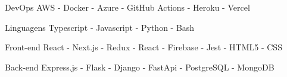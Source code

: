

\begin{cvskills}

  \cvskill
    {DevOps} %
    {AWS - Docker - Azure - GitHub Actions - Heroku - Vercel} %

  \cvskill
    {Linguagens} %
    {Typescript - Javascript - Python - Bash} %

  \cvskill
      {Front-end} %
      {React - Next.js - Redux - React - Firebase - Jest - HTML5 - CSS} %

  \cvskill
    {Back-end} %
    {Express.js - Flask - Django - FastApi -  PostgreSQL - MongoDB} %

\end{cvskills}
